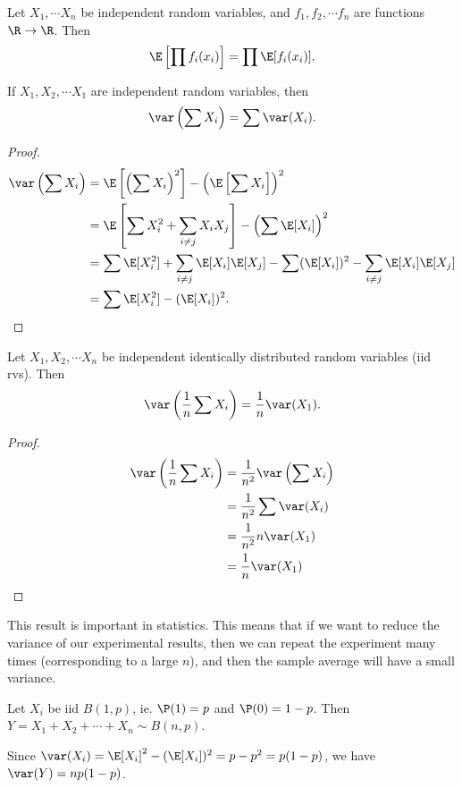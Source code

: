 \documentclass[a4paper]{article}
\begin{document}
\begin{cor}
  Let $X_1,\cdots X_n$ be independent random variables, and $f_1, f_2, \cdots f_n$ are functions $\R\to \R$. Then
  \[
    \E\left[\prod f_i(x_i)\right] = \prod \E[f_i(x_i)].
  \]
\end{cor}

\begin{thm}
  If $X_1, X_2, \cdots X_1$ are independent random variables, then
  \[
    \var\left(\sum X_i\right) = \sum \var (X_i).
  \]
\end{thm}

\begin{proof}
  \begin{align*}
    \var\left(\sum X_i\right) &= \E\left[\left(\sum X_i\right)^2\right] - \left(\E\left[\sum X_i\right]\right)^2\\
    &= \E\left[\sum X_i^2 + \sum_{i \not =j} X_iX_j\right] - \left(\sum\E [X_i]\right)^2\\
    &= \sum \E[X_i^2] + \sum_{i\not= j}\E[X_i]\E[X_j] - \sum(\E[X_i])^2 - \sum_{i\not= j}\E[X_i]\E[X_j]\\
    &= \sum \E[X_i^2] - (\E[X_i])^2.
  \end{align*}
\end{proof}

\begin{cor}
 Let $X_1, X_2, \cdots X_n$ be independent identically distributed random variables (iid rvs). Then
 \[
   \var\left(\frac{1}{n}\sum X_i\right) = \frac{1}{n}\var (X_1).
 \]
\end{cor}

\begin{proof}
  \begin{align*}
    \var\left(\frac{1}{n}\sum X_i\right) &= \frac{1}{n^2}\var\left(\sum X_i\right)\\
    &= \frac{1}{n^2}\sum \var(X_i)\\
    &= \frac{1}{n^2} n \var(X_1)\\
    &= \frac{1}{n}\var (X_1)
  \end{align*}
\end{proof}
This result is important in statistics. This means that if we want to reduce the variance of our experimental results, then we can repeat the experiment many times (corresponding to a large $n$), and then the sample average will have a small variance.

\begin{eg}
  Let $X_i$ be iid $B(1, p)$, ie. $\P(1) = p$ and $\P(0) = 1 - p$. Then $Y = X_1 + X_2 + \cdots + X_n \sim B(n, p)$.

  Since $\var(X_i) = \E[X_i]^2 - (\E[X_i])^2 = p - p^2 = p(1 - p)$, we have $\var (Y) = np(1 - p)$.
\end{eg}
\end{document}

